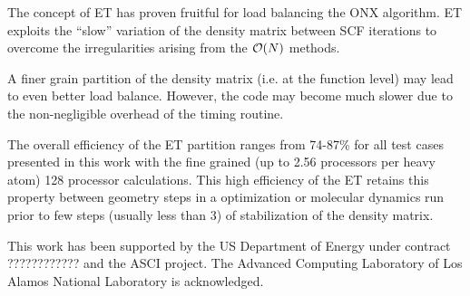 \documentclass[prl,twocolumn,showpacs,twocolumngrid,superbib]{revtex4}
\begin{document}
 The concept of ET has proven fruitful for load balancing the ONX 
 algorithm. ET exploits the ``slow'' variation of the density matrix 
 between SCF iterations to overcome the irregularities arising 
 from the ${\cal O}(N)$ methods.

 A finer grain partition of the density matrix (i.e. at the function level)
 may lead to even better load balance. However, the code 
 may become much slower due to the non-negligible overhead 
 of the timing routine.

 The overall efficiency of the ET partition ranges from 74-87\%
 for all test cases presented in this work with the fine grained
 (up to 2.56 processors per heavy atom) 128 processor calculations.
 This high efficiency of the ET retains this property between geometry steps
 in a optimization or molecular dynamics run prior
 to few steps (usually less than 3) of stabilization of the density matrix.

\begin{acknowledgments}
 This work has been supported by the US Department of Energy
 under contract ???????????? and the ASCI project.
 The Advanced Computing Laboratory of Los
 Alamos National Laboratory is acknowledged.
\end{acknowledgments}

%
\newpage


\end{document}
